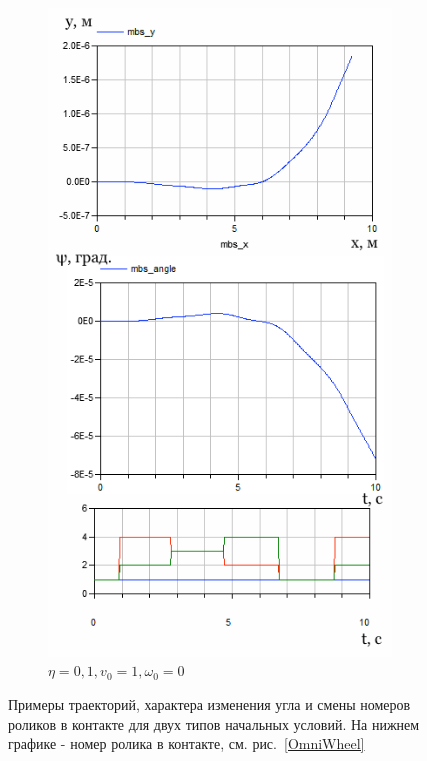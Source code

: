 \begin{figure}[h]
\begin{subfigure}{.47\textwidth}
\end{subfigure}%
\hspace{5pt}
\begin{subfigure}{.47\textwidth}
    \centering
    \includegraphics[width=\textwidth]{content/parts/3_friction/diploma/img/res/example_v_1_0_omega_0_frac_1e-1_n_4_time_10s.png}
    \caption{$\eta = 0,1, v_0 = 1, \omega_0 = 0$}
    \label{fig:exp_example_v}
\end{subfigure}
\caption{Примеры траекторий, характера изменения угла и смены номеров роликов в контакте для двух типов начальных условий. На нижнем графике - номер ролика в контакте, см. рис.~\ref{OmniWheel}}
\label{fig:exp_examples}
\end{figure}
\newpage

